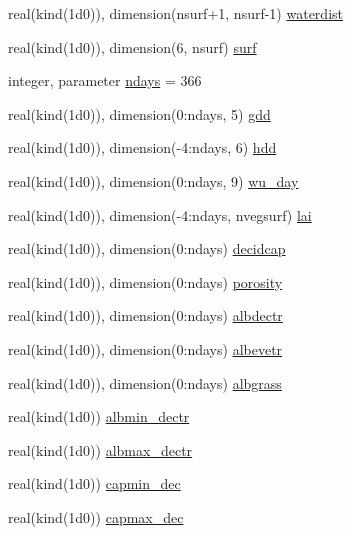 \begin{DoxyCompactItemize}
\item 
real(kind(1d0)), dimension(nsurf+1, nsurf-\/1) \hyperlink{namespaceallocatearray_a7d0c9b91506a6be29f8c45bbb9a0411c}{waterdist}
\item 
real(kind(1d0)), dimension(6, nsurf) \hyperlink{namespaceallocatearray_a25ebdf393dee2419f983b4ac7d2bf2e9}{surf}
\item 
integer, parameter \hyperlink{namespaceallocatearray_ad1f75258d3afd41ea7c941d35561665b}{ndays} = 366
\item 
real(kind(1d0)), dimension(0\+:ndays, 5) \hyperlink{namespaceallocatearray_a75b46c8914271b763866d92533f09b19}{gdd}
\item 
real(kind(1d0)), dimension(-\/4\+:ndays, 6) \hyperlink{namespaceallocatearray_aae45e57c1b2d211392c5f98300524ee8}{hdd}
\item 
real(kind(1d0)), dimension(0\+:ndays, 9) \hyperlink{namespaceallocatearray_a5a9854768fde92cc3ec838f8729f5d42}{wu\+\_\+day}
\item 
real(kind(1d0)), dimension(-\/4\+:ndays, nvegsurf) \hyperlink{namespaceallocatearray_ab660d7e4ca340b0b677a74ecb8bb34f4}{lai}
\item 
real(kind(1d0)), dimension(0\+:ndays) \hyperlink{namespaceallocatearray_a73c64b6d041d6c9bb27a54bd87fcb9b9}{decidcap}
\item 
real(kind(1d0)), dimension(0\+:ndays) \hyperlink{namespaceallocatearray_ad6779574483b9977e34962301653f997}{porosity}
\item 
real(kind(1d0)), dimension(0\+:ndays) \hyperlink{namespaceallocatearray_ac2b3eb71556f66b5cb4a91b0b0e8d6d3}{albdectr}
\item 
real(kind(1d0)), dimension(0\+:ndays) \hyperlink{namespaceallocatearray_a55c401506715656db25c4f3ea8d44956}{albevetr}
\item 
real(kind(1d0)), dimension(0\+:ndays) \hyperlink{namespaceallocatearray_af087b466573effc0552f0a3b2d367db3}{albgrass}
\item 
real(kind(1d0)) \hyperlink{namespaceallocatearray_ab492b6627f6d8d971ea232940929793e}{albmin\+\_\+dectr}
\item 
real(kind(1d0)) \hyperlink{namespaceallocatearray_ab001abfda12eff772a5f95a8c6ac08ec}{albmax\+\_\+dectr}
\item 
real(kind(1d0)) \hyperlink{namespaceallocatearray_a618a159ee64457fbf327e9bed8a0f942}{capmin\+\_\+dec}
\item 
real(kind(1d0)) \hyperlink{namespaceallocatearray_a9efd342ce550303baf767c606737959f}{capmax\+\_\+dec}
\item 

\end{DoxyCompactItemize}
